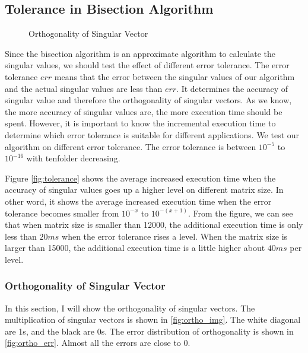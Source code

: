 \subsection{Tolerance in Bisection Algorithm}
\begin{figure}[hbpt]
\vspace{-0.3in}
\centering
\vspace{-0.1in}
  \caption{Orthogonality of Singular Vector}
  \label{fig:ortho}
\vspace{-0.3in}
\end{figure}
Since the bisection algorithm is an approximate algorithm to calculate the singular values, we should test the effect of different error tolerance.
The error tolerance $err$ means that the error between the singular values of our algorithm and the actual singular values are less than $err$.
It determines the accuracy of singular value and therefore the orthogonality of singular vectors.
As we know, the more accuracy of singular values are, the more execution time should be spent.
However, it is important to know the incremental execution time to determine which error tolerance is suitable for different applications.
We test our algorithm on different error tolerance.
The error tolerance is between $10^{-5}$ to $10^{-16}$ with tenfolder decreasing.

Figure \ref{fig:tolerance} shows the average increased execution time when the accuracy of singular values goes up a higher level on different matrix size.
In other word, it shows the average increased execution time when the error tolerance becomes smaller from $10^{-x}$ to $10^{-(x+1)}$.
From the figure, we can see that when matrix size is smaller than 12000, the additional execution time is only less than $20 ms$ when the error tolerance rises a level.
When the matrix size is larger than 15000, the additional execution time is a little higher about $40 ms$ per level.

\subsubsection{Orthogonality of Singular Vector}
In this section, I will show the orthogonality of singular vectors. 
The multiplication of singular vectors is shown in \ref{fig:ortho_img}. The white diagonal are 1s, and the black are 0s. 
The error distribution of orthogonality is shown in \ref{fig:ortho_err}. Almost all the errors are close to 0.
